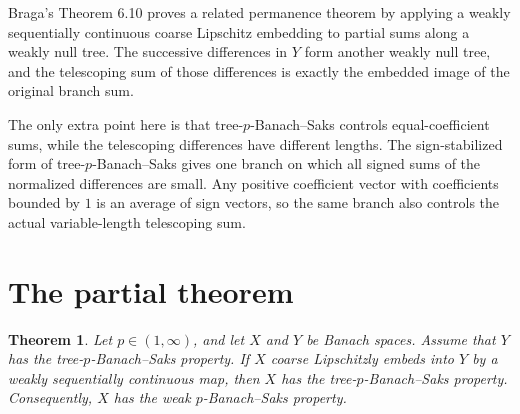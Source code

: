 \documentclass[11pt]{amsart}
\newtheorem{theorem}{Theorem}
\begin{document}
Braga's Theorem 6.10 proves a related permanence theorem by applying a weakly sequentially continuous coarse Lipschitz embedding to partial sums along a weakly null tree.  The successive differences in \(Y\) form another weakly null tree, and the telescoping sum of those differences is exactly the embedded image of the original branch sum.

The only extra point here is that tree-\(p\)-Banach--Saks controls equal-coefficient sums, while the telescoping differences have different lengths.  The sign-stabilized form of tree-\(p\)-Banach--Saks gives one branch on which all signed sums of the normalized differences are small.  Any positive coefficient vector with coefficients bounded by \(1\) is an average of sign vectors, so the same branch also controls the actual variable-length telescoping sum.

\section{The partial theorem}

\begin{theorem}
Let \(p\in(1,\infty)\), and let \(X\) and \(Y\) be Banach spaces.  Assume that \(Y\) has the tree-\(p\)-Banach--Saks property.  If \(X\) coarse Lipschitzly embeds into \(Y\) by a weakly sequentially continuous map, then \(X\) has the tree-\(p\)-Banach--Saks property.  Consequently, \(X\) has the weak \(p\)-Banach--Saks property.
\end{theorem}
\end{document}
